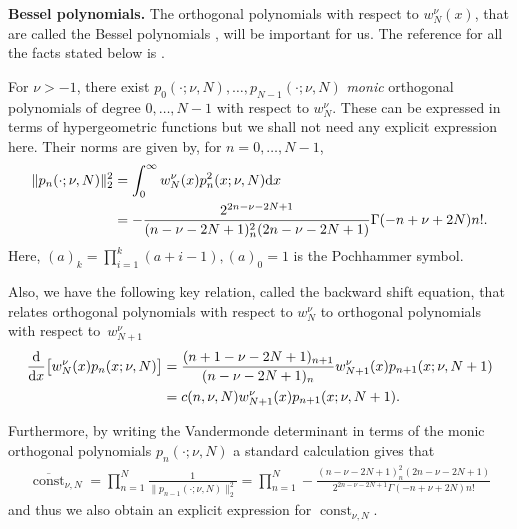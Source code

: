 {\bf Bessel polynomials.} The orthogonal polynomials with respect to $w_N^{\nu}(x)$, that are called the Bessel polynomials \cite{BesselPolynomials}, will be important for us. The reference for all the facts stated below is \cite[Chapter~9.13, pp.~244--247]{HypergeometricOrthogonalPolynomials}.

 For $\nu>-1$, there exist $p_0(\cdot;\nu,N),\dots,p_{N-1}(\cdot;\nu,N)$ \textit{monic} orthogonal polynomials of degree $0,\dots, N-1$ with respect to $w_N^{\nu}$. These can be expressed in terms of hypergeometric functions but we shall not need any explicit expression here. Their norms are given by, for $n=0, \dots, N-1$,
\begin{align*}
\|p_n(\cdot;\nu,N)\|_2^2&= \int_{0}^{\infty}w_N^{\nu}(x)p_n^2(x;\nu,N){\rm d}x\\
&=-\frac{2^{2n-\nu-2N+1}}{(n-\nu-2N+1)_n^2(2n-\nu-2N+1)}\Gamma(-n+\nu+2N)n!.
\end{align*}
Here, $(a)_k=\prod\limits_{i=1}^{k}(a+i-1), (a)_0=1$ is the Pochhammer symbol.

Also, we have the following key relation, called the backward shift equation, that relates orthogonal polynomials with respect to $w_N^{\nu}$ to orthogonal polynomials with respect to~$w_{N+1}^\nu$
\begin{align*}
\frac{{\rm d}}{{\rm d}x}\big[w_N^{\nu}(x)p_n(x;\nu,N)\big]&=\frac{(n+1-\nu-2N+1)_{n+1}}{(n-\nu-2N+1)_n}w_{N+1}^{\nu}(x)p_{n+1}(x;\nu, N+1)\nonumber\\
&=c(n,\nu,N)w_{N+1}^{\nu}(x)p_{n+1}(x;\nu, N+1).
\end{align*}

Furthermore, by writing the Vandermonde determinant in terms of the monic orthogonal polynomials $p_n(\cdot; \nu, N)$ a standard calculation gives that{\samepage
\begin{gather*}
\overline{\operatorname{const}}_{\nu, N}=\prod_{n=1}^{N}\frac{1}{\|p_{n-1}(\cdot;\nu,N)\|_2^2}=\prod_{n=1}^{N}-\frac{(n-\nu-2N+1)_n^2(2n-\nu-2N+1)}{2^{2n-\nu-2N+1}\Gamma(-n+\nu+2N)n!}
\end{gather*}
and thus we also obtain an explicit expression for $\operatorname{const}_{\nu, N}$.}

